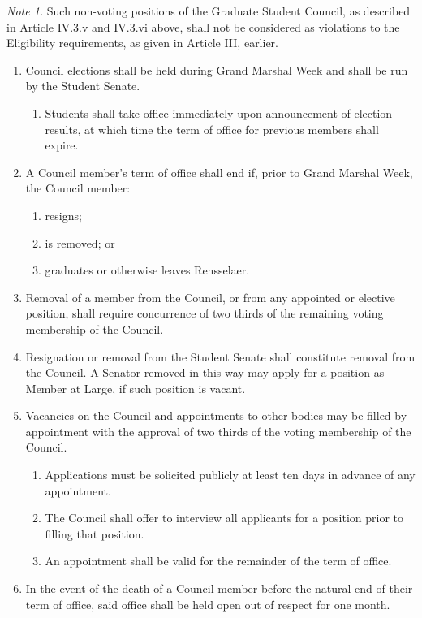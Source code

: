 \documentclass{uniondoc}
\begin{document}
\begin{enumerate}
\begin{enumerate}
  \textit{Note 1.} Such non-voting positions of the Graduate Student Council, as described in Article IV.3.v and IV.3.vi above, shall not be considered as violations to the Eligibility requirements, as given in Article III, earlier.
  \end{enumerate}
\end{enumerate}


\begin{enumerate}
\item Council elections shall be held during Grand Marshal Week and shall be run by the Student Senate.
  \begin{enumerate}
  \item Students shall take office immediately upon announcement of election results, at which time the term of office for previous members shall expire.
  \end{enumerate}
\item A Council member's term of office shall end if, prior to Grand Marshal Week, the Council member:
  \begin{enumerate}
  \item resigns;
  \item is removed; or
  \item graduates or otherwise leaves Rensselaer.
  \end{enumerate}
\item Removal of a member from the Council, or from any appointed or elective position, shall require concurrence of two thirds of the remaining voting membership of the Council.
\item Resignation or removal from the Student Senate shall constitute removal from the Council. A Senator removed in this way may apply for a position as Member at Large, if such position is vacant.
\item Vacancies on the Council and appointments to other bodies may be filled by appointment with the approval of two thirds of the voting membership of the Council.
  \begin{enumerate}
  \item Applications must be solicited publicly at least ten days in advance of any appointment.
  \item The Council shall offer to interview all applicants for a position prior to filling that position.
  \item An appointment shall be valid for the remainder of the term of office.
  \end{enumerate}
\item In the event of the death of a Council member before the natural end of their term of office, said office shall be held open out of respect for one month.
\end{enumerate}
\end{document}
